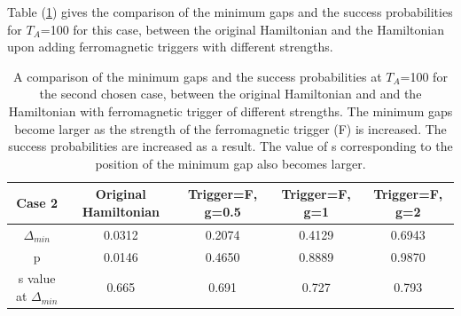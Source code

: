 \documentclass[../main.tex]{subfiles}
\begin{document}
Table (\ref{tab:f2}) gives the comparison of the minimum gaps and the success probabilities for $T_A$=100 for this case, between the original Hamiltonian and the Hamiltonian upon adding ferromagnetic triggers with different strengths.
\begin{table}
\centering
\renewcommand{\arraystretch}{1.8}
\begin{tabular}{|c|c|c|c|c|}
\hline 
Case 2 & Original Hamiltonian & Trigger=F, g=0.5 & Trigger=F, g=1 & Trigger=F, g=2 \\ 
\hline 
$\Delta_{min}$ & 0.0312 & 0.2074 & 0.4129 & 0.6943 \\ 
\hline 
p & 0.0146 & 0.4650 & 0.8889 & 0.9870 \\ 
\hline 
s value at $\Delta_{min}$ & 0.665 & 0.691 & 0.727 & 0.793 \\
\hline

\end{tabular} 
\caption{A comparison of the minimum gaps and the success probabilities at $T_A$=100 for the second chosen case, between the original Hamiltonian and and the Hamiltonian with ferromagnetic trigger of different strengths. The minimum gaps become larger as the strength of the ferromagnetic trigger (F) is increased. The success probabilities are increased as a result. The value of s corresponding to the position of the minimum gap also becomes larger.}
\label{tab:f2}
\end{table}
\end{document}
